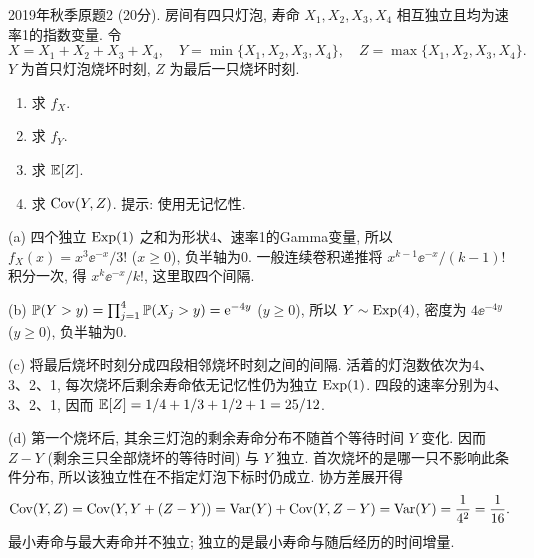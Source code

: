 \begin{exercise}\label{m2:2019f:q2}
2019年秋季原题2 (20分). 房间有四只灯泡, 寿命 $X_1,X_2,X_3,X_4$ 相互独立且均为速率1的指数变量. 令
\[
X=X_1+X_2+X_3+X_4,\quad Y=\min\{X_1,X_2,X_3,X_4\},\quad Z=\max\{X_1,X_2,X_3,X_4\}.
\]
$Y$ 为首只灯泡烧坏时刻, $Z$ 为最后一只烧坏时刻.
\begin{enumerate}
\item[(a)]\label{m2:2019f:q2:a} 求 $f_X$.
\item[(b)]\label{m2:2019f:q2:b} 求 $f_Y$.
\item[(c)]\label{m2:2019f:q2:c} 求 $\mathbb E[Z]$.
\item[(d)]\label{m2:2019f:q2:d} 求 $\operatorname{Cov}(Y,Z)$. 提示: 使用无记忆性.
\end{enumerate}
\end{exercise}
\begin{solution}
(a) 四个独立 $\operatorname{Exp}(1)$ 之和为形状4、速率1的Gamma变量, 所以 $f_X(x)=x^3\ee^{-x}/3!$ ($x\ge0$), 负半轴为0. 一般连续卷积递推将 $x^{k-1}\ee^{-x}/(k-1)!$ 积分一次, 得 $x^k\ee^{-x}/k!$, 这里取四个间隔.

(b) $\mathbb P(Y>y)=\prod_{j=1}^4\mathbb P(X_j>y)=\mathrm e^{-4y}$ ($y\ge0$), 所以 $Y\sim\operatorname{Exp}(4)$, 密度为 $4\ee^{-4y}$ ($y\ge0$), 负半轴为0.

(c) 将最后烧坏时刻分成四段相邻烧坏时刻之间的间隔. 活着的灯泡数依次为4、3、2、1, 每次烧坏后剩余寿命依无记忆性仍为独立 $\operatorname{Exp}(1)$. 四段的速率分别为4、3、2、1, 因而 $\mathbb E[Z]=1/4+1/3+1/2+1=25/12$.

(d) 第一个烧坏后, 其余三灯泡的剩余寿命分布不随首个等待时间 $Y$ 变化. 因而 $Z-Y$ (剩余三只全部烧坏的等待时间) 与 $Y$ 独立. 首次烧坏的是哪一只不影响此条件分布, 所以该独立性在不指定灯泡下标时仍成立. 协方差展开得
\[
\operatorname{Cov}(Y,Z)=\operatorname{Cov}(Y,Y+(Z-Y))=\operatorname{Var}(Y)+\operatorname{Cov}(Y,Z-Y)=\operatorname{Var}(Y)=\frac1{4^2}=\frac1{16}.
\]
最小寿命与最大寿命并不独立; 独立的是最小寿命与随后经历的时间增量.
\end{solution}

